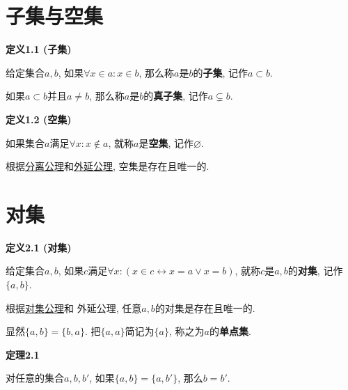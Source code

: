 \documentclass[UTF8]{ctexart}
\begin{document}
\setlength{\abovedisplayskip}{1pt}
\setlength{\belowdisplayskip}{1pt}

\section{子集与空集}

\hypertarget{sec:定义1.1}{}
\noindent\textbf{定义1.1 (子集)}

给定集合$a,b$, 如果$\forall x\in a:x\in b$,
那么称$a$是$b$的\textbf{子集}, 记作$a\subset b$.

如果$a\subset b$并且$a\neq b$, 那么称$a$是$b$的\textbf{真子集}, 记作$a\subsetneq b$.

\vspace{10pt}

\hypertarget{sec:定义1.2}{}
\noindent\textbf{定义1.2 (空集)}

如果集合$a$满足$\forall x:x\notin a$, 就称$a$是\textbf{空集}, 记作$\varnothing$.

根据\href{../01 ZFC 公理/01 ZFC 公理#nameddest=sec:分离公理模式}
{分离公理}和\href{../01 ZFC 公理/01 ZFC 公理#nameddest=sec:外延公理}{外延公理},
空集是存在且唯一的.





\vspace{20pt}

\section{对集}

\hypertarget{sec:定义2.1}{}
\noindent\textbf{定义2.1 (对集)}

给定集合$a,b$, 如果$c$满足$\forall x:(x\in c\leftrightarrow x=a\lor x=b)$,
就称$c$是$a,b$的\textbf{对集}, 记作$\{a,b\}$.

根据\href{../01 ZFC 公理/01 ZFC 公理#nameddest=sec:对集公理}{对集公理}和
外延公理, 任意$a,b$的对集是存在且唯一的.

\vspace{10pt}

显然$\{a,b\}=\{b,a\}$. 把$\{a,a\}$简记为$\{a\}$, 称之为$a$的\textbf{单点集}.

\vspace{10pt}

\hypertarget{sec:定理2.1}{}
\noindent\textbf{定理2.1}

对任意的集合$a,b,b'$, 如果$\{a,b\}=\{a,b'\}$, 那么$b=b'$.

\end{document}
